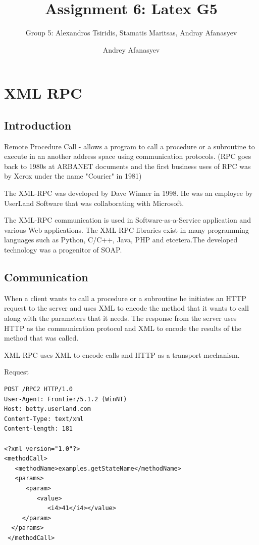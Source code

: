 \documentclass[11pt]{article}
\title{Assignment 6: Latex G5}
\author{Group 5: Alexandros Tsiridis, Stamatis Maritsas, Andray Afanasyev}
\date{}
\begin{document}
\maketitle
\tableofcontents
\listoffigures
\listoftables
\newpage

\section{XML RPC}
\author{Andrey Afanasyev}
\subsection{Introduction}

Remote Procedure Call - allows a program to call a procedure or a subroutine to execute in an another address space using communication protocols. (RPC goes back to 1980s at ARBANET documents and the first business uses of RPC was by Xerox under the name "Courier" in 1981)\cite{XML-RPC-WIKI}

The XML-RPC was developed by Dave Winner in 1998. He was an employee by UserLand Software that was collaborating with Microsoft.
 
The XML-RPC communication is used in Software-as-a-Service application and various Web applications. The XML-RPC libraries exist in many programming languages such as Python, C/C++, Java, PHP and etcetera.The developed technology was a progenitor of SOAP.

\subsection{Communication}

When a client wants to call a procedure or a subroutine he initiates an HTTP request to the server and uses XML to encode the method that it wants to call along with the parameters that it needs. The response from the server uses HTTP as the communication protocol and XML to encode the results of the method that was called.\cite{XML-RPC-tldp}

XML-RPC uses XML to encode calls and HTTP as a transport
mechanism.\cite{XML-RPC-specs}


Request
\begin{lstlisting}[frame=single]
POST /RPC2 HTTP/1.0
User-Agent: Frontier/5.1.2 (WinNT)
Host: betty.userland.com
Content-Type: text/xml
Content-length: 181
        
<?xml version="1.0"?>
<methodCall>
   <methodName>examples.getStateName</methodName>
   <params>
      <param>
         <value>
            <i4>41</i4></value>
     </param>
  </params>
 </methodCall>
\end{lstlisting}
\end{document}
